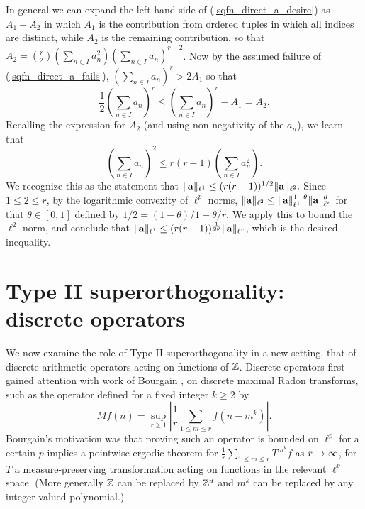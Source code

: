 \documentclass[oneside,11pt]{amsart}
\begin{document}
In general we can expand the left-hand side of (\ref{sqfn_direct_a_desire}) as $A_1 + A_2$ 
in which $A_1$ is the contribution from ordered tuples  in which all indices are distinct, while $A_2$ is the remaining contribution, so that $A_2= {r \choose 2} (\sum_{n \in I} a_n^2)(\sum_{n \in I} a_n)^{r-2}$. 
Now by  the assumed failure of (\ref{sqfn_direct_a_fails}), 
$(\sum_{n \in I} a_n)^r > 2A_1$
 so that 
\[ \frac{1}{2} (\sum_{n \in I} a_n)^r \leq (\sum_{n \in I} a_n)^r - A_1 = A_2.\]
Recalling the expression for $A_2$ (and using   non-negativity of the $a_n$), we learn that 
\[ (\sum_{n \in I} a_n)^2 \leq r(r-1)(\sum_{n \in I} a_n^2).\]
We recognize this as the statement   that 
$\|{\bf a} \|_{\ell^1} \leq (r(r-1))^{1/2} \|{\bf a}\|_{\ell^2}.$ 
Since $1 \leq 2 \leq r$, by the logarithmic convexity of $\ell^p$ norms,
$\|{\bf a}\|_{\ell^2} \leq \|{\bf a}\|_{\ell^1}^{1 - \theta} \|{\bf a}\|_{\ell^r}^{\theta}$ for that $\theta \in [0,1]$ defined by
$1/2 = (1-\theta)/1 + \theta/r$. We apply this to bound the $\ell^2$ norm, and conclude that 
$\|{\bf a}\|_{\ell^1} \leq (r(r-1))^{\frac{1}{2\theta}} \|{\bf a}\|_{\ell^r}$, which is the desired inequality.




 
 
\section{Type II superorthogonality: discrete operators }\label{sec_TI_discrete}
We now examine the role of Type II superorthogonality in a new setting, that of discrete arithmetic operators acting on functions of $\mathbb{Z}$. 
Discrete operators first gained attention with work of Bourgain \cite{Bou88A,Bou88B,Bou88C,Bou89}, on discrete maximal Radon transforms, such as the operator defined for a fixed integer $k \geq 2$ by
\[ Mf(n)=  \sup_{r \geq 1} \left|\frac{1}{r}  \sum_{1 \leq m \leq r} f(n-m^k) \right|.\]
Bourgain's motivation was that proving such an operator is bounded on $\ell^p$ for a certain $p$ implies a pointwise ergodic theorem  for 
$ \frac{1}{r} \sum_{1 \leq m \leq r} T^{m^k}f$ as $r \rightarrow \infty$, for $T$ a measure-preserving transformation acting on functions in the relevant $\ell^p$ space.  (More generally $\mathbb{Z}$ can be replaced by $\mathbb{Z}^d$ and $m^k$ can be replaced by any integer-valued polynomial.)
\end{document}
